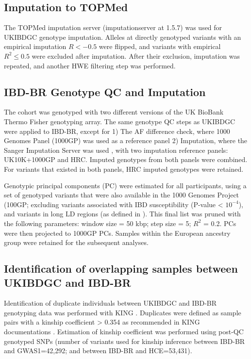 \subsection{Imputation to TOPMed}
The TOPMed imputation server (imputationserver at 1.5.7) was used for UKIBDGC genotype imputation. Alleles at directly genotyped variants with an empirical imputation $R < -0.5$ were flipped, and variants with empirical $R^{2} \leq 0.5$ were excluded after imputation. After their exclusion, imputation was repeated, and another HWE filtering step was performed.

\subsection{IBD-BR Genotype QC and Imputation}
The cohort was genotyped with two different versions of the UK BioBank Thermo Fisher genotyping array. The same genotype QC steps as UKIBDGC were applied to IBD-BR, except for 1) The AF difference check, where 1000 Genomes Panel (1000GP) was used as a reference panel 2) Imputation, where the Sanger Imputation Server was used \cite{1000gp}, with two imputation reference panels: UK10K+1000GP and HRC. Imputed genotypes from both panels were combined. For variants that existed in both panels, HRC imputed genotypes were retained. 

Genotypic principal components (PC) were estimated for all participants, using a set of genotyped variants that were also available in the 1000 Genomes Project (100GP; excluding variants associated with IBD susceptibility (P-value < $10^{-4}$), and variants in long LD regions (as defined in \cite{plink_high_ld}). This final list was pruned with the following parameters: window size = 50 kbp; step size = 5; $R^{2}$ = 0.2. PCs were then projected to 1000GP PCs. Samples within the European ancestry group were retained for the subsequent analyses. 

\subsection{Identification of overlapping samples between UKIBDGC and IBD-BR}
Identification of duplicate individuals between UKIBDGC and IBD-BR genotyping data was performed with KING \cite{king-software}. Duplicates were defined as sample pairs with a kinship coefficient > 0.354 as recommended in KING documentations \cite{king-software}. Estimation of kinship coefficient was performed using post-QC genotyped SNPs (number of variants used for kinship inference between IBD-BR and GWAS1=42,292; and between IBD-BR and HCE=53,431).

